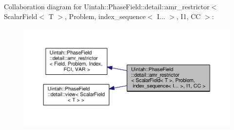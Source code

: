 Collaboration diagram for Uintah\+:\+:Phase\+Field\+:\+:detail\+:\+:amr\+\_\+restrictor$<$ Scalar\+Field$<$ T $>$, Problem, index\+\_\+sequence$<$ I... $>$, I1, CC $>$\+:\nopagebreak
\begin{figure}[H]
\begin{center}
\leavevmode
\includegraphics[width=350pt]{classUintah_1_1PhaseField_1_1detail_1_1amr__restrictor_3_01ScalarField_3_01T_01_4_00_01Problem_02d933a6b5ef956be4511371ad65666b6}
\end{center}
\end{figure}
